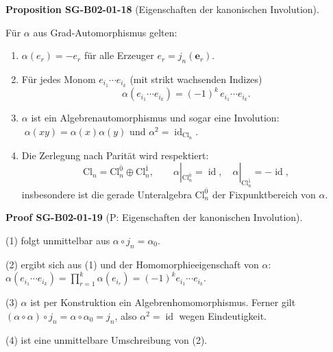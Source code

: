 \documentclass[10pt, letterpaper]{article}
\newcommand{\id}{\operatorname{id}}
\newcommand{\Cl}{\mathrm{Cl}}
\newcommand{\CustomHeading}[3]{%
  \par\medskip\noindent%
  \textbf{#1 #2} \textnormal{(#3)}.\enskip%
}
\newenvironment{PROP}[2]{\begin{unitbox}\CustomHeading{Proposition}{#1}{#2}}{\end{unitbox}}
\newenvironment{PROOF}[2]{\begin{unitbox}\CustomHeading{Proof}{#1}{#2}}{\end{unitbox}}
\begin{document}
\begin{PROP}{SG-B02-01-18}{Eigenschaften der kanonischen Involution}
Für \(\alpha\) aus Grad-Automorphismus gelten:
\begin{enumerate}
  \item \(\alpha(e_r)=-e_r\) für alle Erzeuger \(e_r=j_n(\mathbf e_r)\).
  \item Für jedes Monom \(e_{i_1}\cdots e_{i_k}\) (mit strikt wachsenden Indizes)
  \[
  \alpha\!\left(e_{i_1}\cdots e_{i_k}\right)=(-1)^k\,e_{i_1}\cdots e_{i_k}.
  \]
  \item \(\alpha\) ist ein Algebrenautomorphismus und sogar eine Involution:
  \(\;\alpha(xy)=\alpha(x)\alpha(y)\) und \(\alpha^2=\id_{\Cl_n}\).
  \item Die Zerlegung nach Parität wird respektiert:
  \[
  \Cl_n=\Cl_n^{\bar 0}\oplus \Cl_n^{\bar 1},\qquad
  \alpha|_{\Cl_n^{\bar 0}}=\id,\quad \alpha|_{\Cl_n^{\bar 1}}=-\id,
  \]
  insbesondere ist die gerade Unteralgebra \(\Cl_n^{\bar 0}\) der Fixpunktbereich von \(\alpha\).
\end{enumerate}
\end{PROP}




\begin{PROOF}{SG-B02-01-19}{P: Eigenschaften der kanonischen Involution}
(1) folgt unmittelbar aus \(\alpha\circ j_n=\alpha_0\).

(2) ergibt sich aus (1) und der Homomorphieeigenschaft von \(\alpha\):
\(\alpha(e_{i_1}\cdots e_{i_k})=\prod_{r=1}^k\alpha(e_{i_r})=(-1)^k e_{i_1}\cdots e_{i_k}\).

(3) \(\alpha\) ist per Konstruktion ein Algebrenhomomorphismus. Ferner gilt
\((\alpha\circ\alpha)\circ j_n=\alpha\circ\alpha_0=j_n\), also \(\alpha^2=\id\) wegen Eindeutigkeit.

(4) ist eine unmittelbare Umschreibung von (2).
\end{PROOF}
\end{document}

